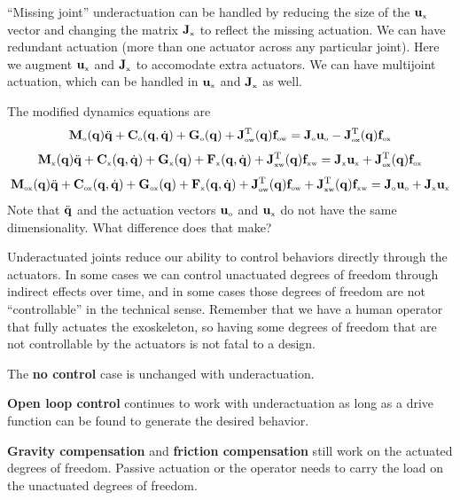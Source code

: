 \documentclass[letterpaper,12pt,fullpage]{article}
\newcommand{\myo}{{\mbox {\tiny o}}}
\newcommand{\myx}{{\mbox {\tiny x}}}
\newcommand{\ox}{{\mbox {\tiny ox}}}
\newcommand{\ow}{{\mbox {\tiny ow}}}
\newcommand{\xw}{{\mbox {\tiny xw}}}
\begin{document}
``Missing joint''
underactuation can be handled by reducing the size of the $\vu_{\myx}$ vector
and changing the matrix $\mJ_{\myx}$ to reflect the missing actuation.
We can have redundant actuation (more than one actuator across any particular
joint). Here we augment $\vu_{\myx}$ and $\mJ_{\myx}$ to accomodate extra actuators.
We can have multijoint actuation, which can be handled in $\vu_{\myx}$ 
and $\mJ_{\myx}$ as well.

The modified dynamics equations are
\begin{equation}
\mM_{\myo}(\vq) \ddot{\vq} + \mC_{\myo}(\vq,\dot{\vq}) + \mG_{\myo}(\vq)
+ \mJ_{\ow}^{\tr}(\vq) \vf_{\ow} = \mJ_{\myo} \vu_{\myo} - \mJ_{\ox}^{\tr}(\vq) \vf_{\ox}
\label{eq:odynamics2}
\end{equation}
\begin{equation}
\mM_{\myx}(\vq) \ddot{\vq} + \mC_{\myx}(\vq,\dot{\vq}) + \mG_{\myx}(\vq)
+ \mF_{\myx}(\vq,\dot{\vq})
+ \mJ_{\xw}^{\tr}(\vq) \vf_{\xw} = \mJ_{\myx} \vu_{\myx} + \mJ_{\ox}^{\tr}(\vq) \vf_{\ox}
\label{eq:xdynamics2}
\end{equation}
\begin{equation}
\mM_{\ox}(\vq) \ddot{\vq} + \mC_{\ox}(\vq,\dot{\vq}) + \mG_{\ox}(\vq)
+ \mF_{\myx}(\vq,\dot{\vq})
+ \mJ_{\ow}^{\tr}(\vq) \vf_{\ow}
+ \mJ_{\xw}^{\tr}(\vq) \vf_{\xw} 
= \mJ_{\myo} \vu_{\myo} + \mJ_{\myx} \vu_{\myx}
\label{eq:oxdynamics2}
\end{equation}
Note that $\ddot{{\bf q}}$ and the actuation vectors $\vu_{\myo}$ and $\vu_{\myx}$
do not have the same dimensionality. What difference does that make?

Underactuated joints reduce our ability to control behaviors directly
through the actuators. In some cases we can control unactuated degrees of freedom
through indirect effects over time, and in some cases those degrees of freedom
are not ``controllable'' in the technical sense. Remember that we have a human
operator that fully actuates the exoskeleton, so having some degrees of freedom
that are not controllable by the actuators is not fatal to a design.

The {\bf no control} case is unchanged with underactuation.

{\bf Open loop control} continues to work with underactuation
as long as a drive function can be found
to generate the desired behavior.

{\bf Gravity compensation} and {\bf friction compensation}
still work on the actuated degrees
of freedom. Passive actuation or 
the operator needs to carry the load on the unactuated degrees of freedom.
\end{document}
